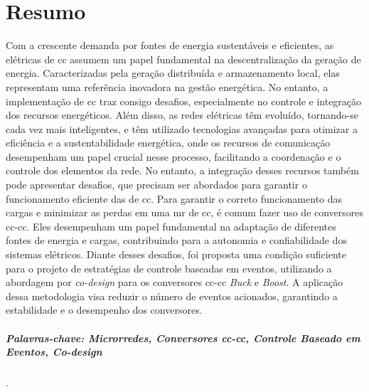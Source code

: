 \chapter*{Resumo}
\thispagestyle{empty}

Com a crescente demanda por fontes de energia sustentáveis e eficientes, as  elétricas de \acrfull{cc} assumem um papel fundamental na descentralização da geração de energia. Caracterizadas pela geração distribuída e armazenamento local, elas representam uma referência inovadora na gestão energética. No entanto, a implementação de  \acrshort{cc} traz consigo desafios, especialmente no controle e integração dos recursos energéticos. Além disso, as redes elétricas têm evoluído, tornando-se cada vez mais inteligentes, e têm utilizado tecnologias avançadas para otimizar a eficiência e a sustentabilidade energética, onde os recursos de comunicação desempenham um papel crucial nesse processo, facilitando a coordenação e o controle dos elementos da rede. No entanto, a integração desses recursos também pode apresentar desafios, que precisam ser abordados para garantir o funcionamento eficiente das  de \acrshort{cc}. Para garantir o correto funcionamento das cargas e minimizar as perdas em uma \acrshort{mr} de \acrshort{cc}, é comum fazer uso de conversores \acrshort{cc}-\acrshort{cc}. Eles desempenham um papel fundamental na adaptação de diferentes fontes de energia e cargas, contribuindo para a autonomia e confiabilidade dos sistemas elétricos. Diante desses desafios, foi proposta uma condição suficiente para o projeto de estratégias de controle baseadas em eventos, utilizando a abordagem por \textit{co-design} para os conversores \acrshort{cc}-\acrshort{cc} \textit{Buck} e \textit{Boost}. A aplicação dessa metodologia visa reduzir o número de eventos acionados, garantindo a estabilidade e o desempenho dos conversores.

\vspace{50pt}

\paragraph{Palavras-chave: Microrredes, Conversores \acrshort{cc}-\acrshort{cc}, Controle Baseado em Eventos, \textit{Co-design}}.
